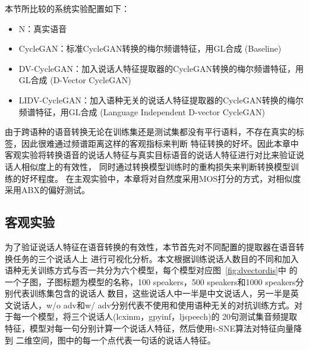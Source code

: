 本节所比较的系统实验配置如下：
\begin{itemize}
    \item N：真实语音
    \item CycleGAN：标准CycleGAN转换的梅尔频谱特征，用GL合成 (Baseline)
    \item DV-CycleGAN：加入说话人特征提取器的CycleGAN转换的梅尔频谱特征，用GL合成 (D-Vector CycleGAN)
    \item LIDV-CycleGAN：加入语种无关的说话人特征提取器的CycleGAN转换的梅尔频谱特征，用GL合成 (Language Independent D-vector CycleGAN)
\end{itemize}

由于跨语种的语音转换无论在训练集还是测试集都没有平行语料，不存在真实的标签，因此很难通过频谱距离这样的客观指标来判断
特征转换的好坏。因此本章中客观实验将转换语音的说话人特征与真实目标语音的说话人特征进行对比来验证说话人相似度上的有效性，
同时通过转换模型训练时的重构损失来判断转换模型训练的好坏程度。
在主观实验中，本章将对自然度采用MOS打分的方式，对相似度采用ABX的偏好测试。

\subsection{客观实验}

为了验证说话人特征在语音转换的有效性，本节首先对不同配置的提取器在语音转换任务的三个说话人上
进行可视化分析。本文根据训练说话人数目的不同和加入语种无关训练方式与否一共分为六个模型，每个模型对应图~\ref{fig:dvectordis}中
的一个子图，子图标题为模型的名称，100 speakers，500 speakers和1000 speakers分别代表训练集包含的说话人
数目，这些说话人中一半是中文说话人，另一半是英文说话人，w/o adv和w/ adv分别代表不使用和使用语种无关的对抗训练方式。对于每一个模型，将三个说话人(lcxinm，gpyinf，ljspeech)的
20句测试集音频提取特征，模型对每一句分别计算一个说话人特征，然后使用t-SNE算法\cite{maaten2008visualizing}对特征向量降到
二维空间，图中的每一个点代表一句话的说话人特征。


